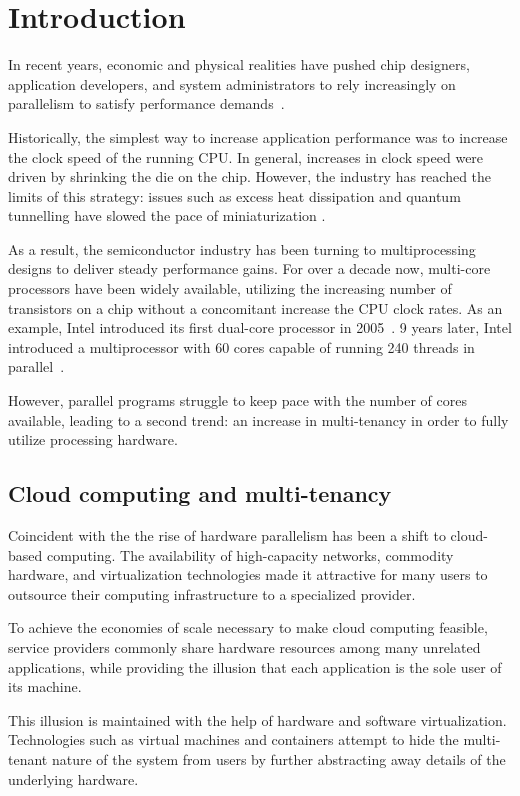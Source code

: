 \section{Introduction}

In recent years, economic and physical realities have pushed chip designers, application developers, and system administrators to rely increasingly on parallelism to satisfy performance demands~\cite{mack2011fifty}. 

Historically, the simplest way to increase application performance was to increase the clock speed of the running CPU. In general, increases in clock speed were driven by shrinking the die on the chip. However, the industry has reached the limits of this strategy: issues such as excess heat dissipation and quantum tunnelling have slowed the pace of miniaturization \cite{kish2002end}.

As a result, the semiconductor industry has been turning to multiprocessing designs to deliver steady performance gains. For over a decade now, multi-core processors have been widely available, utilizing the increasing number of transistors on a chip without a concomitant increase the CPU clock rates.  As an example, Intel introduced its first dual-core processor in 2005~\cite{intel2005pentiumee}.  9 years later, Intel introduced a multiprocessor with 60 cores capable of running 240 threads in parallel~\cite{intel2013xeonphi3120a}.

However, parallel programs struggle to keep pace with the number of cores available, leading to a second trend: an increase in multi-tenancy in order to fully utilize processing hardware.

\subsection{Cloud computing and multi-tenancy}
Coincident with the the rise of hardware parallelism has been a shift to cloud-based computing. The availability of high-capacity networks, commodity hardware, and virtualization technologies made it attractive for many users to outsource their computing infrastructure to a specialized provider.

To achieve the economies of scale necessary to make cloud computing feasible, service providers commonly share hardware resources among many unrelated applications, while providing the illusion that each application is the sole user of its machine.

This illusion is maintained with the help of hardware and software virtualization. Technologies such as virtual machines and containers attempt to hide the multi-tenant nature of the system from users by further abstracting away details of the underlying hardware.

